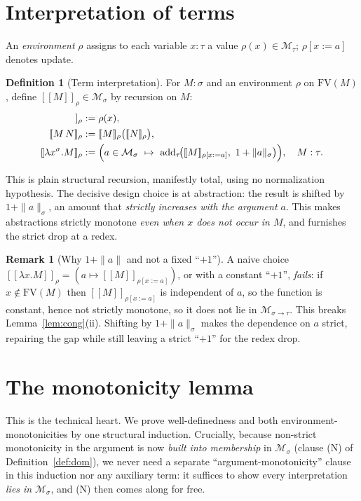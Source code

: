 \documentclass{amsart}
\theoremstyle{definition}
\newtheorem{definition}{Definition}
\newtheorem{remark}{Remark}
\newcommand{\interp}[1]{[\![#1]\!]}
\newcommand{\FV}{\mathrm{FV}}
\begin{document}
\section{Interpretation of terms}

An \emph{environment} $\rho$ assigns to each variable $x:\tau$ a value
$\rho(x)\in\mathcal M_\tau$; $\rho[x:=a]$ denotes update.

\begin{definition}[Term interpretation]\label{def:interp}
For $M:\sigma$ and an environment $\rho$ on $\FV(M)$, define $\interp{M}_\rho\in\mathcal M_\sigma$
by recursion on $M$:
\begin{align*}
  \interp{x}_\rho &:= \rho(x),\\
  \interp{M\,N}_\rho &:= \interp{M}_\rho\bigl(\interp{N}_\rho\bigr),\\
  \interp{\lambda x^\sigma.M}_\rho &:=
     \Bigl(a\in\mathcal M_\sigma\ \mapsto\
       \mathrm{add}_\tau\!\bigl(\interp{M}_{\rho[x:=a]},\ 1+\|a\|_\sigma\bigr)\Bigr),
     \quad M:\tau .
\end{align*}
\end{definition}

This is plain structural recursion, manifestly total, using no normalization hypothesis.
The decisive design choice is at abstraction: the result is shifted by $1+\|a\|_\sigma$, an
amount that \emph{strictly increases with the argument $a$}. This makes abstractions
strictly monotone \emph{even when $x$ does not occur in $M$}, and furnishes the strict drop
at a redex.

\begin{remark}[Why $1+\|a\|$ and not a fixed ``$+1$'']\label{rem:why}
A naive choice $\interp{\lambda x.M}_\rho=(a\mapsto\interp{M}_{\rho[x:=a]})$, or with a
constant ``$+1$'', \emph{fails}: if $x\notin\FV(M)$ then $\interp{M}_{\rho[x:=a]}$ is
independent of $a$, so the function is constant, hence not strictly monotone, so it does not
lie in $\mathcal M_{\sigma\to\tau}$. This breaks Lemma~\ref{lem:cong}(ii). Shifting by
$1+\|a\|_\sigma$ makes the dependence on $a$ strict, repairing the gap while still leaving a
strict ``$+1$'' for the redex drop.
\end{remark}

\section{The monotonicity lemma}

This is the technical heart. We prove well-definedness and both environment-monotonicities by
one structural induction. Crucially, because non-strict monotonicity in the argument is now
\emph{built into membership} in $\mathcal M_\sigma$ (clause (N) of Definition~\ref{def:dom}),
we never need a separate ``argument-monotonicity'' clause in this induction nor any auxiliary
term: it suffices to show every interpretation \emph{lies in} $\mathcal M_\sigma$, and (N)
then comes along for free.
\end{document}
